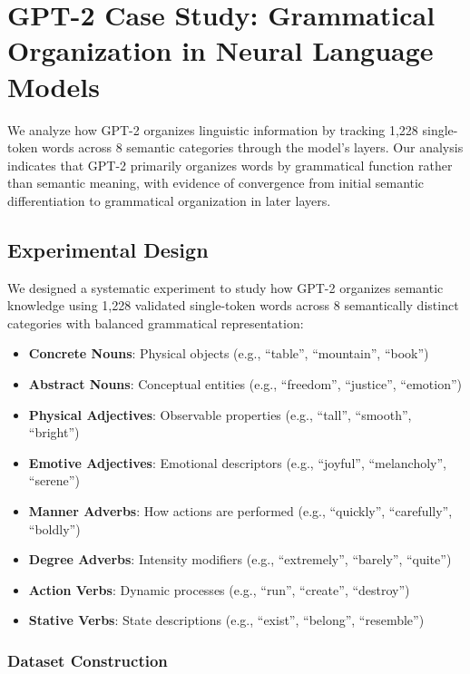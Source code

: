 \section{GPT-2 Case Study: Grammatical Organization in Neural Language Models}

We analyze how GPT-2 organizes linguistic information by tracking 1,228 single-token words across 8 semantic categories through the model's layers. Our analysis indicates that GPT-2 primarily organizes words by grammatical function rather than semantic meaning, with evidence of convergence from initial semantic differentiation to grammatical organization in later layers.

\subsection{Experimental Design}

We designed a systematic experiment to study how GPT-2 organizes semantic knowledge using 1,228 validated single-token words across 8 semantically distinct categories with balanced grammatical representation:

\begin{itemize}
    \item \textbf{Concrete Nouns}: Physical objects (e.g., ``table'', ``mountain'', ``book'')
    \item \textbf{Abstract Nouns}: Conceptual entities (e.g., ``freedom'', ``justice'', ``emotion'')
    \item \textbf{Physical Adjectives}: Observable properties (e.g., ``tall'', ``smooth'', ``bright'')
    \item \textbf{Emotive Adjectives}: Emotional descriptors (e.g., ``joyful'', ``melancholy'', ``serene'')
    \item \textbf{Manner Adverbs}: How actions are performed (e.g., ``quickly'', ``carefully'', ``boldly'')
    \item \textbf{Degree Adverbs}: Intensity modifiers (e.g., ``extremely'', ``barely'', ``quite'')
    \item \textbf{Action Verbs}: Dynamic processes (e.g., ``run'', ``create'', ``destroy'')
    \item \textbf{Stative Verbs}: State descriptions (e.g., ``exist'', ``belong'', ``resemble'')
\end{itemize}

\subsubsection{Dataset Construction}

